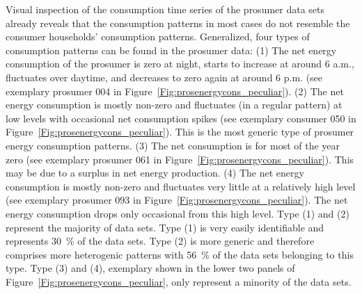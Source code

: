 Visual inspection of the consumption time series of the prosumer data sets already reveals that the consumption patterns in most cases do not resemble the consumer households' consumption patterns. Generalized, four types of consumption patterns can be found in the prosumer data: (1) The net energy consumption of the prosumer is zero at night, starts to increase at around 6 a.m., fluctuates over daytime, and decreases to zero again at around 6 p.m. (see exemplary prosumer 004 in Figure~\ref{Fig:prosenergycons_peculiar}). (2) The net energy consumption is mostly non-zero and fluctuates (in a regular pattern) at low levels with occasional net consumption spikes (see exemplary consumer 050 in Figure~\ref{Fig:prosenergycons_peculiar}). This is the most generic type of prosumer energy consumption patterns. (3) The net consumption is for most of the year zero (see exemplary prosumer 061 in Figure~\ref{Fig:prosenergycons_peculiar}). This may be due to a surplus in net energy production. (4) The net energy consumption is mostly non-zero and fluctuates very little at a relatively high level (see exemplary prosumer 093 in Figure~\ref{Fig:prosenergycons_peculiar}). The net energy consumption drops only occasional from this high level. Type (1) and (2) represent the majority of data sets. Type (1) is very easily identifiable and represents 30~\% of the data sets. Type (2) is more generic and therefore comprises more heterogenic patterns with 56~\% of the data sets belonging to this type. Type (3) and (4), exemplary shown in the lower two panels of Figure~\ref{Fig:prosenergycons_peculiar}, only represent a minority of the data sets.

